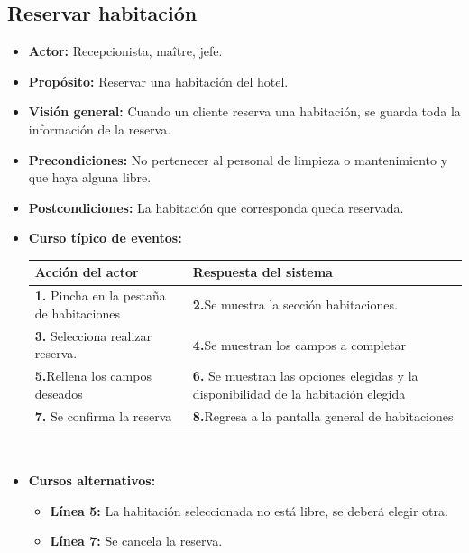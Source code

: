 \documentclass[spanish,a4paper,11pt, twoside]{report}	%
\begin{document}
	\subsection{Reservar habitación}
		\begin{itemize}
			\item \textbf{Actor:} Recepcionista, maître, jefe.
			\item \textbf{Propósito: } Reservar una habitación del hotel.
			\item \textbf{Visión general:} Cuando un cliente reserva una habitación, se guarda toda la información de la reserva.
			\item \textbf{Precondiciones:} No pertenecer al personal de limpieza o mantenimiento y que haya alguna libre.
			\item \textbf{Postcondiciones:} La habitación que corresponda queda reservada.
			\item \textbf{Curso típico de eventos:} 	\\
				\begin{tabular}{|p{6cm}||p{6cm}|}
				\hline
				\textbf{Acción del actor} & \textbf{Respuesta del sistema} \\ \hline
				\textbf{1.} Pincha en la pestaña de habitaciones & \textbf{2.}Se muestra la sección habitaciones.\\ \hline 
				\textbf{3.} Selecciona realizar reserva. & \textbf{4.}Se muestran los campos a completar  \\ \hline
				\textbf{5.}Rellena los campos deseados & \textbf{6.} Se muestran las opciones elegidas y la disponibilidad de la habitación elegida \\ \hline
				\textbf{7.} Se confirma la reserva & \textbf{8.}Regresa a la pantalla general de habitaciones\\ \hline
			\end{tabular}
			\\
			\item \textbf{Cursos alternativos:} 
			\begin{itemize}
			\item  \textbf{Línea 5:} La habitación seleccionada no está libre, se deberá elegir otra.
			\item  \textbf{Línea 7:} Se cancela la reserva. \\
			\end {itemize}
		\end {itemize}

\end{document}
